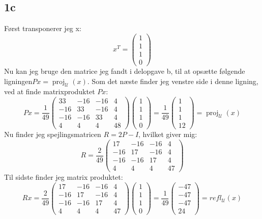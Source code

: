 \documentclass{article}
\begin{document}
\subsection*{1c}
Først transponerer jeg x:
$$
x^T=\left(\begin{array}{l}
1 \\
1 \\
1 \\
0
\end{array}\right)
$$
Nu kan jeg bruge den matrice jeg fandt i delopgave b, til at opsætte følgende ligningen$P x=\operatorname{proj}_{\mathcal{U}}(x)$.
Som det næste finder jeg venstre side i denne ligning, ved at finde matrixproduktet $Px$:
$$
P x=\frac{1}{49}\left(\begin{array}{cccc}
33 & -16 & -16 & 4 \\
-16 & 33 & -16 & 4 \\
-16 & -16 & 33 & 4 \\
4 & 4 & 4 & 48
\end{array}\right)\left(\begin{array}{l}
1 \\
1 \\
1 \\
0
\end{array}\right)=\frac{1}{49}\left(\begin{array}{c}
1 \\
1 \\
1 \\
12
\end{array}\right)=\operatorname{proj}_{\mathcal{U}}(x)
$$
Nu finder jeg spejlingsmatricen $R=2 P-I$, hvilket giver mig:
$$
R=\frac{2}{49}\left(\begin{array}{cccc}
17 & -16 & -16 & 4 \\
-16 & 17 & -16 & 4 \\
-16 & -16 & 17 & 4 \\
4 & 4 & 4 & 47
\end{array}\right)
$$
Til sidste finder jeg matrix produktet:
$$
R x=\frac{2}{49}\left(\begin{array}{cccc}
17 & -16 & -16 & 4 \\
-16 & 17 & -16 & 4 \\
-16 & -16 & 17 & 4 \\
4 & 4 & 4 & 47
\end{array}\right)\left(\begin{array}{l}
1 \\
1 \\
1 \\
0
\end{array}\right)=\frac{1}{49}\left(\begin{array}{c}
-47 \\
-47 \\
-47 \\
24
\end{array}\right)=r e f l_{\mathcal{U}}(x)
$$
\end{document}
